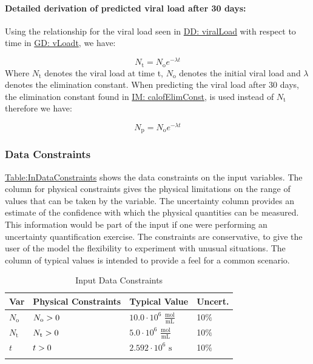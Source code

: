 \documentclass[12pt]{article}
\newcommand{\gt}{\ensuremath >}
\begin{document}
\paragraph{Detailed derivation of predicted viral load after 30 days:}
\label{IM:calofPredictedVLDeriv}
Using the relationship for the viral load seen in \hyperref[DD:viralLoad]{DD: viralLoad} with respect to time in \hyperref[GD:vLoadt]{GD: vLoadt}, we have:

\begin{displaymath}
{N_{\text{t}}}={N_{\text{o}}} e^{-λ t}
\end{displaymath}
Where ${N_{\text{t}}}$ denotes the viral load at time t, ${N_{\text{o}}}$ denotes the initial viral load and $λ$ denotes the elimination constant. When predicting the viral load after 30 days, the elimination constant  found in \hyperref[IM:calofElimConst]{IM: calofElimConst},  is used instead of ${N_{\text{t}}}$  therefore we have:

\begin{displaymath}
{N_{\text{p}}}={N_{\text{o}}} e^{-λ t}
\end{displaymath}
\subsubsection{Data Constraints}
\label{Sec:DataConstraints}
\hyperref[Table:InDataConstraints]{Table:InDataConstraints} shows the data constraints on the input variables. The column for physical constraints gives the physical limitations on the range of values that can be taken by the variable. The uncertainty column provides an estimate of the confidence with which the physical quantities can be measured. This information would be part of the input if one were performing an uncertainty quantification exercise. The constraints are conservative, to give the user of the model the flexibility to experiment with unusual situations. The column of typical values is intended to provide a feel for a common scenario.

\begin{longtable}{l l l l}
\toprule
\textbf{Var} & \textbf{Physical Constraints} & \textbf{Typical Value} & \textbf{Uncert.}
\\
\midrule
\endhead
${N_{\text{o}}}$ & ${N_{\text{o}}}\gt{}0$ & $10.0\cdot{}10^{6}$ $\frac{\text{mol}}{\text{mL}}$ & 10$\%$
\\
${N_{\text{t}}}$ & ${N_{\text{t}}}\gt{}0$ & $5.0\cdot{}10^{6}$ $\frac{\text{mol}}{\text{mL}}$ & 10$\%$
\\
$t$ & $t\gt{}0$ & $2.592\cdot{}10^{6}$ ${\text{s}}$ & 10$\%$
\\
\bottomrule
\caption{Input Data Constraints}
\label{Table:InDataConstraints}
\end{longtable}
\end{document}
